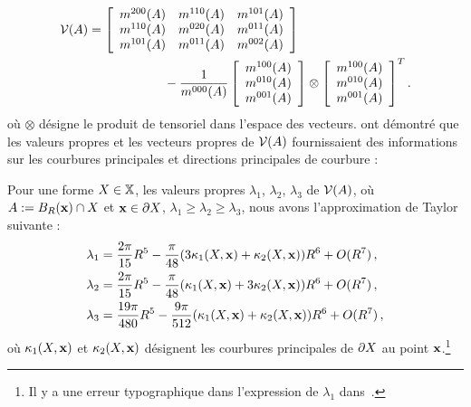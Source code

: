 \begin{align}
  \mathcal{V}(A) &=  \left\lbrack
    \begin{array}{ccc}
      m^{200}(A) & m^{110}(A) & m^{101}(A)\\
      m^{110}(A) & m^{020}(A) & m^{011}(A)\\
      m^{101}(A) & m^{011}(A) & m^{002}(A)
    \end{array}
    \right\rbrack\quad\quad\quad\quad\quad\quad \nonumber \\
    &\quad\quad\quad\quad\quad\quad- \frac{1}{m^{000}(A)}
    \left\lbrack
    \begin{array}{c}
      m^{100}(A) \\
      m^{010}(A) \\
      m^{001}(A) \\
    \end{array}
    \right\rbrack
    \otimes
    \left\lbrack
    \begin{array}{c}
      m^{100}(A) \\
      m^{010}(A) \\
      m^{001}(A) \\
    \end{array}
    \right\rbrack^T.
\label{eq:defCov}
\end{align}
%
où $\otimes$ désigne le produit de tensoriel dans l'espace des vecteurs.
%
 ont démontré que les valeurs propres et les
vecteurs propres de $\mathcal{V}(A)$ fournissaient des informations sur les courbures
principales et directions principales de courbure :
%
\begin{lemma}
 \label{lem:pottmann-3d}
 Pour une forme $X \in \mathbb{X}$, les valeurs propres $\lambda_1$,
 $\lambda_2$, $\lambda_3$ de $\mathcal{V}(A)$, où $ A := B_{R}(\mathbf{x}) \cap
 X$ et $\mathbf{x} \in \partial X$, $\lambda_1 \ge \lambda_2 \ge
 \lambda_3$, nous avons l'approximation de Taylor suivante :
 \begin{align}
   \lambda_1& = \frac{2\pi}{15}R^5 - \frac{\pi}{48}(3\kappa_{1}(X,\mathbf{x}) + \kappa_{2}(X,\mathbf{x}))R^6 + O(R^7)\,,\\
   \lambda_2& = \frac{2\pi}{15}R^5 - \frac{\pi}{48}(\kappa_{1}(X,\mathbf{x}) + 3\kappa_{2}(X,\mathbf{x}))R^6 + O(R^7)\,,\\
   \lambda_3& = \frac{19\pi}{480}R^5 - \frac{9\pi}{512}(\kappa_{1}(X,\mathbf{x}) + \kappa_{2}(X,\mathbf{x}))R^6 + O(R^7)\,,
 \end{align}
 où $\kappa_{1}(X,\mathbf{x})$ et $\kappa_{2}(X,\mathbf{x})$ désignent les
 courbures principales de  $\partial X$ au point $\mathbf{x}$.\footnote{Il y a une
 erreur typographique dans l'expression de $\lambda_1$ dans~\cite{Pottmann2007}.}
\end{lemma}
